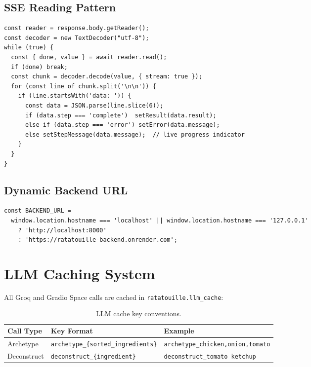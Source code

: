 \documentclass[12pt, a4paper]{article}
\begin{document}
\subsection{SSE Reading Pattern}

\begin{lstlisting}[style=text, 
  caption={Native browser ReadableStream SSE client (no external library).}]
const reader = response.body.getReader();
const decoder = new TextDecoder("utf-8");
while (true) {
  const { done, value } = await reader.read();
  if (done) break;
  const chunk = decoder.decode(value, { stream: true });
  for (const line of chunk.split('\n\n')) {
    if (line.startsWith('data: ')) {
      const data = JSON.parse(line.slice(6));
      if (data.step === 'complete')  setResult(data.result);
      else if (data.step === 'error') setError(data.message);
      else setStepMessage(data.message);  // live progress indicator
    }
  }
}
\end{lstlisting}

\subsection{Dynamic Backend URL}

\begin{lstlisting}[style=text, 
  caption={Automatic local/cloud backend switching.}]
const BACKEND_URL =
  window.location.hostname === 'localhost' || window.location.hostname === '127.0.0.1'
    ? 'http://localhost:8000'
    : 'https://ratatouille-backend.onrender.com';
\end{lstlisting}

\section{LLM Caching System}

All Groq and Gradio Space calls are cached in \texttt{ratatouille.llm\_cache}:

\begin{table}[H]
\centering
\caption{LLM cache key conventions.}
\label{tab:cache_keys}
\begin{tabular}{l l l}
\toprule
\textbf{Call Type} & \textbf{Key Format} & \textbf{Example} \\
\midrule
Archetype      & \texttt{archetype\_\{sorted\_ingredients\}}    & \texttt{archetype\_chicken,onion,tomato} \\
Deconstruct    & \texttt{deconstruct\_\{ingredient\}}            & \texttt{deconstruct\_tomato ketchup} \\
\bottomrule
\end{tabular}
\end{table}
\end{document}
